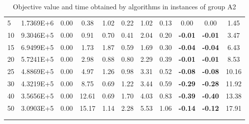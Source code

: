 {\begin{longtable}{@{}llccccccccc@{}}
\multicolumn{1}{l|}{5}  & \multicolumn{1}{l|}{1.7369E+6}  & 0.00 & \multicolumn{1}{c|}{0.38}  & 1.02  & \multicolumn{1}{c|}{0.22} & 1.02  & \multicolumn{1}{c|}{0.13} & 0.00           & 0.00           & 1.45  \\
\multicolumn{1}{l|}{10} & \multicolumn{1}{l|}{9.3046E+5}  & 0.00 & \multicolumn{1}{c|}{0.91}  & 0.70  & \multicolumn{1}{c|}{0.41} & 2.04  & \multicolumn{1}{c|}{0.20} & \textbf{-0.01} & \textbf{-0.01} & 3.47  \\
\multicolumn{1}{l|}{15} & \multicolumn{1}{l|}{6.9499E+5}  & 0.00 & \multicolumn{1}{c|}{1.73}  & 1.87  & \multicolumn{1}{c|}{0.59} & 1.69  & \multicolumn{1}{c|}{0.30} & \textbf{-0.04} & \textbf{-0.04} & 6.43  \\
\multicolumn{1}{l|}{20} & \multicolumn{1}{l|}{5.7241E+5}  & 0.00 & \multicolumn{1}{c|}{2.98}  & 0.88  & \multicolumn{1}{c|}{0.80} & 2.29  & \multicolumn{1}{c|}{0.39} & \textbf{-0.01} & \textbf{-0.01} & 8.53  \\
\multicolumn{1}{l|}{25} & \multicolumn{1}{l|}{4.8869E+5}  & 0.00 & \multicolumn{1}{c|}{4.97}  & 1.26  & \multicolumn{1}{c|}{0.98} & 3.31  & \multicolumn{1}{c|}{0.52} & \textbf{-0.08} & \textbf{-0.08} & 10.16 \\
\multicolumn{1}{l|}{30} & \multicolumn{1}{l|}{4.3219E+5}  & 0.00 & \multicolumn{1}{c|}{8.75}  & 0.69  & \multicolumn{1}{c|}{1.22} & 3.44  & \multicolumn{1}{c|}{0.59} & \textbf{-0.29} & \textbf{-0.28} & 11.92 \\
\multicolumn{1}{l|}{40} & \multicolumn{1}{l|}{3.5656E+5}  & 0.00 & \multicolumn{1}{c|}{12.61} & 0.69  & \multicolumn{1}{c|}{1.70} & 4.03  & \multicolumn{1}{c|}{0.83} & \textbf{-0.39} & \textbf{-0.40} & 13.38 \\
\multicolumn{1}{l|}{50} & \multicolumn{1}{l|}{3.0903E+5}  & 0.00 & \multicolumn{1}{c|}{15.17} & 1.14  & \multicolumn{1}{c|}{2.28} & 5.53  & \multicolumn{1}{c|}{1.06} & \textbf{-0.14} & \textbf{-0.12} & 17.91 \\ \hline
\caption{Objective value and time obtained by algorithms in instances of group A2}\\
\label{results-all-A2}\\
\end{longtable}}
